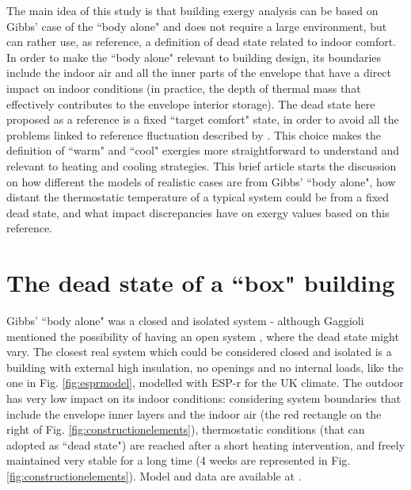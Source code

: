\documentclass[10pt]{extarticle} %
\begin{document}
The main idea of this study is that building exergy analysis can be based on Gibbs' case of the ``body alone" and does not require a large environment, but can rather use, as reference, a definition of dead state related to indoor comfort. In order to make the ``body alone" relevant to building design, its boundaries include the indoor air and all the inner parts of the envelope that have a direct impact on indoor conditions (in practice, the depth of thermal mass that effectively contributes to the envelope interior storage). The dead state here proposed as a reference is a fixed ``target comfort" state, in order to avoid all the problems linked to reference fluctuation described by \cite{Pons2019}. This choice makes the definition of ``warm" and ``cool" exergies more straightforward to understand and relevant to heating and cooling strategies. This brief article starts the discussion on how different the models of realistic cases are from Gibbs' ``body alone", how distant the thermostatic temperature of a typical system could be from a fixed dead state, and what impact  discrepancies have on exergy values based on this reference.


\section{The dead state of a ``box" building} \label{subsec:simple}

Gibbs' ``body alone" was a closed and isolated system - although Gaggioli mentioned the possibility of having an open system \citep{Gaggioli1961}, where the dead state might vary. The closest real system which could be considered closed and isolated is a building with external high insulation, no openings and no internal loads, like the one in Fig. \ref{fig:esprmodel}, modelled with ESP-r for the UK climate. The outdoor has very low impact on its indoor conditions: considering system boundaries that include the envelope inner layers and the indoor air (the red rectangle on the right of Fig. \ref{fig:constructionelements}), thermostatic conditions (that can adopted as ``dead state") are reached after a short heating intervention, and freely maintained very stable for a long time (4 weeks are represented in Fig. \ref{fig:constructionelements}). Model and data are available at \cite{Bonetti2020}.
\end{document}
